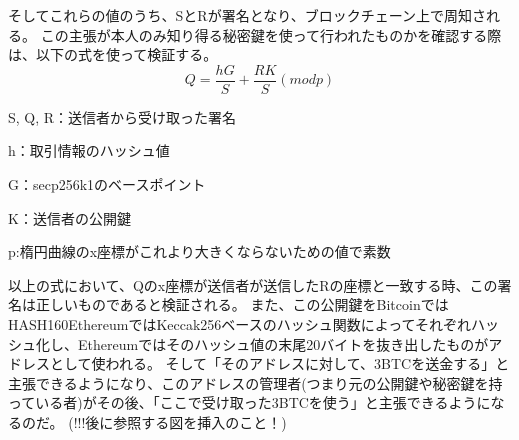 そしてこれらの値のうち、SとRが署名となり、ブロックチェーン上で周知される。
この主張が本人のみ知り得る秘密鍵を使って行われたものかを確認する際は、以下の式を使って検証する。
\begin{equation}
Q=\frac{hG}{S}+\frac{RK}{S}{(mod p)}
\end{equation}

\begin{list}{}{}
\item S, Q, R：送信者から受け取った署名
\item h：取引情報のハッシュ値
\item G：secp256k1のベースポイント
\item K：送信者の公開鍵
\item p:楕円曲線のx座標がこれより大きくならないための値で素数
\end{list}

以上の式において、Qのx座標が送信者が送信したRの座標と一致する時、この署名は正しいものであると検証される。
また、この公開鍵をBitcoinではHASH160EthereumではKeccak256ベースのハッシュ関数によってそれぞれハッシュ化し、Ethereumではそのハッシュ値の末尾20バイトを抜き出したものがアドレスとして使われる。
そして「そのアドレスに対して、3BTCを送金する」と主張できるようになり、このアドレスの管理者(つまり元の公開鍵や秘密鍵を持っている者)がその後、「ここで受け取った3BTCを使う」と主張できるようになるのだ。
(!!!後に参照する図を挿入のこと！)

